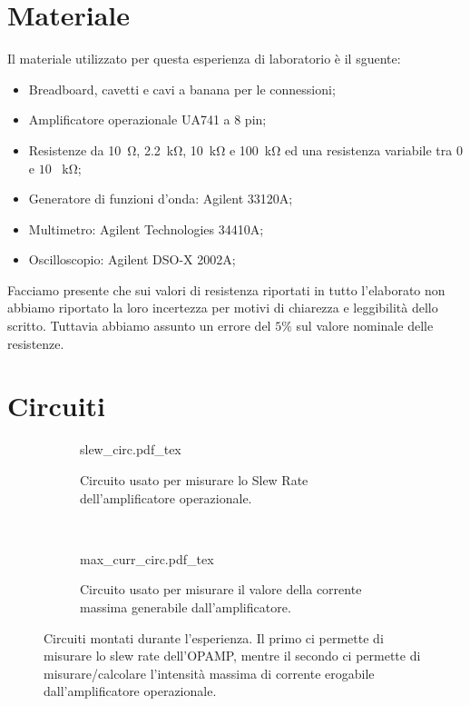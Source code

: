 \section*{Materiale}

Il materiale utilizzato per questa esperienza di laboratorio è il sguente:

\begin{itemize} \itemsep2pt \parskip0pt 
    \item{Breadboard, cavetti e cavi a banana per le connessioni;}
    \item{Amplificatore operazionale UA741 a 8 pin;}
    \item{Resistenze da \SI{10}{\ohm}, \SI{2.2}{\kilo\ohm}, \SI{10}{\kilo\ohm} e \SI{100}{\kilo\ohm} ed una resistenza variabile tra $0$ e $10$ \SI{}{\kilo\ohm};}
    \item{Generatore di funzioni d'onda: Agilent 33120A;}
    \item{Multimetro: Agilent Technologies 34410A;}
    \item{Oscilloscopio: Agilent DSO-X 2002A;}
\end{itemize}

Facciamo presente che sui valori di resistenza riportati in tutto l'elaborato non abbiamo riportato la loro incertezza per motivi di chiarezza e leggibilità dello scritto. Tuttavia abbiamo assunto un errore del $5\%$ sul valore nominale delle resistenze.

\section*{Circuiti}

\begin{figure}[h]
        \centering
        \begin{subfigure}[b]{0.45\textwidth}
        		\def\svgwidth{\textwidth}
                {slew_circ.pdf_tex}
                \caption{Circuito usato per misurare lo Slew Rate dell'amplificatore operazionale.}
                \label{fig:slew_rate}
        \end{subfigure}
        ~
        \begin{subfigure}[b]{0.45\textwidth}
        		\def\svgwidth{\textwidth}
                {max_curr_circ.pdf_tex}
                \caption{Circuito usato per misurare il valore della corrente massima generabile dall'amplificatore.}
                \label{fig:current}
        \end{subfigure}
        \caption{Circuiti montati durante l'esperienza. Il primo ci permette di misurare lo slew rate dell'OPAMP, mentre il secondo ci permette di misurare/calcolare l'intensità massima di corrente erogabile dall'amplificatore operazionale.}
\end{figure}